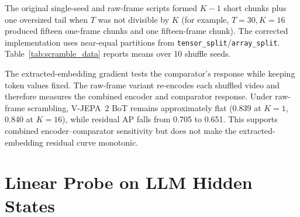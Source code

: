 \documentclass{article}
\theoremstyle{remark}
\begin{document}
The original single-seed and raw-frame scripts formed $K-1$ short chunks plus one oversized tail when $T$ was not divisible by $K$ (for example, $T\!=\!30,K\!=\!16$ produced fifteen one-frame chunks and one fifteen-frame chunk). The corrected implementation uses near-equal partitions from \texttt{tensor\_split}/\texttt{array\_split}. Table~\ref{tab:scramble_data} reports means over 10 shuffle seeds.

\begin{table}[h]
\centering
\caption{Corrected AP across near-equal scramble partitions on VCDB (10 seeds). Across nontrivial $K$, the maximum standard deviation is 0.0101; invariant rows have zero variance.}
\label{tab:scramble_data}
\end{table}

The extracted-embedding gradient tests the comparator's response while keeping token values fixed. The raw-frame variant re-encodes each shuffled video and therefore measures the combined encoder and comparator response. Under raw-frame scrambling, V-JEPA~2 BoT remains approximately flat (0.839 at $K\!=\!1$, 0.840 at $K\!=\!16$), while residual AP falls from 0.705 to 0.651. This supports combined encoder--comparator sensitivity but does not make the extracted-embedding residual curve monotonic.

\section{Linear Probe on LLM Hidden States}
\label{sec:linear_probe}
\end{document}
